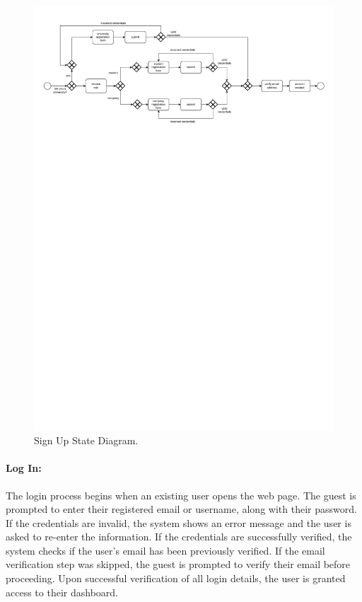 \begin{figure}[H]
    \begin{center}
        \includegraphics[width=\linewidth]{Images/StateDiagram/SignUp.pdf}
        \caption{Sign Up State Diagram.}
        \label{fig:sign_up_state_diag}%
    \end{center}
\end{figure}

\newpage

\paragraph{Log In:} The login process begins when an existing user 
  opens the web page. The guest is prompted to enter their 
  registered email or username, along with their password.
  If the credentials are invalid, the system shows an error message and
  the user is asked to re-enter the information. If the credentials are
  successfully verified, the system checks if the user's email has been
  previously verified. If the email verification step was skipped, the guest is prompted to verify their email before proceeding. Upon successful verification 
  of all login details, the user is granted access to their dashboard.

